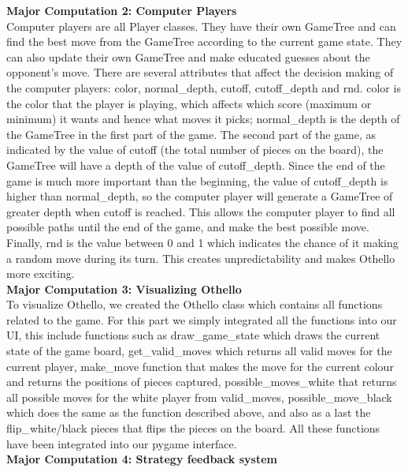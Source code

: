 \documentclass[fontsize=11pt]{article}
\begin{document}
\textbf{Major Computation 2: Computer Players}\\

Computer players are all Player classes. They have their own GameTree and can find the best move from the GameTree according to the current game state. They can also update their own GameTree and make educated guesses about the opponent's move. There are several attributes that affect the decision making of the computer players: color, normal\_depth, cutoff, cutoff\_depth and rnd. color is the color that the player is playing, which affects which score (maximum or minimum) it wants and hence what moves it picks; normal\_depth is the depth of the GameTree in the first part of the game. The second part of the game, as indicated by the value of cutoff (the total number of pieces on the board), the GameTree will have a depth of the value of cutoff\_depth. Since the end of the game is much more important than the beginning, the value of cutoff\_depth is higher than normal\_depth, so the computer player will generate a GameTree of greater depth when cutoff is reached. This allows the computer player to find all possible paths until the end of the game, and make the best possible move. Finally, rnd is the value between 0 and 1 which indicates the chance of it making a random move during its turn. This creates unpredictability and makes Othello more exciting.\\

\textbf{Major Computation 3: Visualizing Othello}\\

To visualize Othello, we created the Othello class which contains all functions related to the game. For this part we simply integrated all the functions into our UI, this include functions such as draw\_game\_state which draws the current state of the game board, get\_valid\_moves which returns all valid moves for the current player, make\_move function that makes the move for the current colour and returns the positions of pieces captured, possible\_moves\_white that returns all possible moves for the white player from valid\_moves, possible\_move\_black which does the same as the function described above, and also as a last the flip\_white/black pieces that flips the pieces on the board. All these functions have been integrated into our pygame interface. \\

\textbf{Major Computation 4: Strategy feedback system}\\
\end{document}
